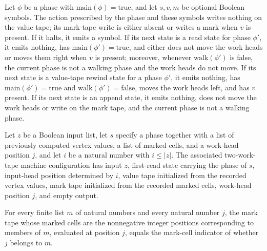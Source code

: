 \begin{theorem}
\label{BoolCircuit.CircuitEval.lact_ok}
\leanok
{}
Let $\phi$ be a phase with $\text{main}(\phi)=\text{true}$, and let $s,v,m$ be optional
Boolean symbols. The action prescribed by the phase and these symbols writes nothing on
the value tape; its mark-tape write is either absent or writes a mark when $v$ is
present. If it halts, it emits a symbol. If its next state is a read state for phase
$\phi'$, it emits nothing, has $\text{main}(\phi')=\text{true}$, and either does not
move the work heads or moves them right when $v$ is present; moreover, whenever
$\text{walk}(\phi')$ is false, the current phase is not a walking phase and the work
heads do not move. If its next state is a value-tape rewind state for a phase $\phi'$,
it emits nothing, has $\text{main}(\phi')=\text{true}$ and
$\text{walk}(\phi')=\text{false}$, moves the work heads left, and has $v$ present. If
its next state is an append state, it emits nothing, does not move the work heads or
write on the mark tape, and the current phase is not a walking phase.
\end{theorem}

\begin{definition}
\label{BoolCircuit.CircuitEval.Internal.cfA}
\leanok
{}
Let $z$ be a Boolean input list, let $s$ specify a phase together with a list of
previously computed vertex values, a list of marked cells, and a work-head position $j$,
and let $i$ be a natural number with $i\le |z|$. The associated two-work-tape machine
configuration has input $z$, first-read state carrying the phase of $s$, input-head
position determined by $i$, value tape initialized from the recorded vertex values, mark
tape initialized from the recorded marked cells, work-head position $j$, and empty
output.
\end{definition}

\begin{theorem}
\label{BoolCircuit.CircuitEval.tapeM_nat}
\leanok
{}
For every finite list $m$ of natural numbers and every natural number $j$, the mark tape
whose marked cells are the nonnegative integer positions corresponding to members of
$m$, evaluated at position $j$, equals the mark-cell indicator of whether $j$ belongs to
$m$.
\end{theorem}

